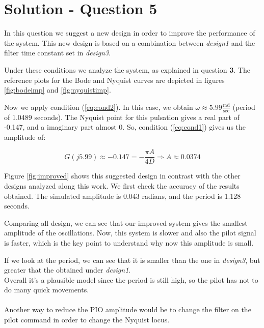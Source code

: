\section*{Solution - Question 5}
In this question we suggest a new design in order to improve the performance of the system. This new design is based on a combination between \textit{design1} and the filter time constant set in \textit{design3}. 

Under these conditions we analyze the system, as explained in question \textbf{3}. The reference plots for the Bode and Nyquist curves are depicted in figures \ref{fig:bodeimp} and \ref{fig:nyquistimp}. 

Now we apply condition (\ref{eq:cond2}). In this case, we obtain $\omega \approx 5.99 \frac{\textrm{rad}}{\textrm{sec}}$ (period of 1.0489 seconds). The Nyquist point for this pulsation gives a real part of -0.147, and a imaginary part almost 0. So, condition (\ref{eq:cond1}) gives us the amplitude of: 

$$ G(j5.99) \approx -0.147 = -\frac{\pi A}{4D} \Rightarrow A \approx 0.0374$$

Figure \ref{fig:improved} shows this suggested design in contrast with the other designs analyzed along this work. We first check the accuracy of the results obtained. The simulated amplitude is 0.043 radians, and the period is 1.128 seconds.

Comparing all design, we can see that our improved system gives the smallest amplitude of the oscillations. Now, this system is slower and also the pilot signal is faster, which is the key point to understand why now this amplitude is small. 

If we look at the period, we can see that it is smaller than the one in \textit{design3}, but greater that the obtained under \textit{design1}.  \\
Overall it's a plausible model since the period is still high, so the pilot has not to do many quick movements. \\ \\
Another way to reduce the PIO amplitude would be to change the filter on the pilot command in order to change the Nyquist locus.
